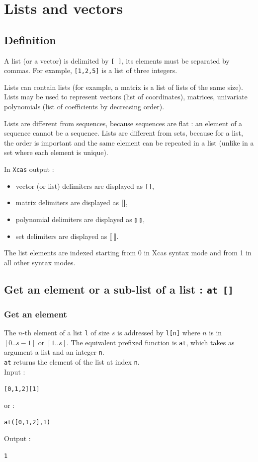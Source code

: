 \documentclass[a4paper,11pt]{book}
\begin{document}
\section{Lists and vectors}
\subsection{Definition}
A list (or a vector) is delimited by {\tt [ ]},
its elements must be separated by commas. 
For example, {\tt [1,2,5]} is a list of three integers.

Lists can contain lists (for example, a matrix is a list of lists 
of the same size). Lists may be used to represent vectors
(list of coordinates), matrices, univariate polynomials 
(list of coefficients by decreasing order). 

Lists are different from sequences, because sequences are flat : an element 
of a sequence cannot be a sequence.
Lists are different from sets, because for a list, the order is
important and the same element can be repeated in a list (unlike in
a set where each element is unique). 

In {\tt Xcas} output :
\begin{itemize}
\item vector (or list) delimiters are displayed as {\tt []}, 
\item matrix delimiters are displayed as {\bf []},
\item polynomial delimiters are displayed as $\talloblong \ \talloblong$,
\item set delimiters are displayed as $\llbracket \ \rrbracket$.
\end{itemize}

The list elements are indexed starting from 0 in Xcas syntax mode
and from 1 in all other syntax modes.


\subsection{Get an element or a sub-list of a list : {\tt at []}}\label{sec:at}
\subsubsection{Get an element}
\noindent The $n$-th element of a list {\tt l} of size $s$
is addressed by {\tt l[n]} where $n$ is in $[0..s-1]$ or $[1..s]$.
The equivalent prefixed function is
{\tt at}, which takes as argument a list and an integer {\tt n}.\\
{\tt at} returns the element of the list at index {\tt n}.\\
Input :
\begin{center}{\tt [0,1,2][1]}\end{center}
or :
\begin{center}{\tt at([0,1,2],1)}\end{center}
Output :
\begin{center}{\tt  1}\end{center}
\end{document}
